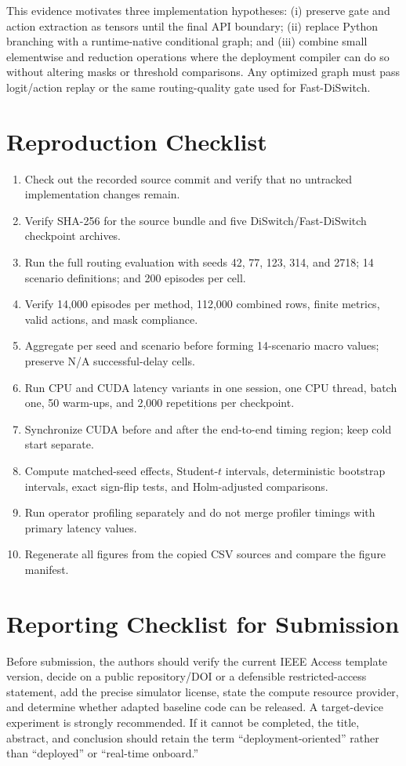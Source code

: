 \documentclass{ieeeaccess}
\begin{document}
This evidence motivates three implementation hypotheses: (i) preserve gate and action extraction as tensors until the final API boundary; (ii) replace Python branching with a runtime-native conditional graph; and (iii) combine small elementwise and reduction operations where the deployment compiler can do so without altering masks or threshold comparisons. Any optimized graph must pass logit/action replay or the same routing-quality gate used for Fast-DiSwitch.

\section{Reproduction Checklist}

\begin{enumerate}
\item Check out the recorded source commit and verify that no untracked implementation changes remain.
\item Verify SHA-256 for the source bundle and five DiSwitch/Fast-DiSwitch checkpoint archives.
\item Run the full routing evaluation with seeds 42, 77, 123, 314, and 2718; 14 scenario definitions; and 200 episodes per cell.
\item Verify 14,000 episodes per method, 112,000 combined rows, finite metrics, valid actions, and mask compliance.
\item Aggregate per seed and scenario before forming 14-scenario macro values; preserve N/A successful-delay cells.
\item Run CPU and CUDA latency variants in one session, one CPU thread, batch one, 50 warm-ups, and 2,000 repetitions per checkpoint.
\item Synchronize CUDA before and after the end-to-end timing region; keep cold start separate.
\item Compute matched-seed effects, Student-$t$ intervals, deterministic bootstrap intervals, exact sign-flip tests, and Holm-adjusted comparisons.
\item Run operator profiling separately and do not merge profiler timings with primary latency values.
\item Regenerate all figures from the copied CSV sources and compare the figure manifest.
\end{enumerate}

\section{Reporting Checklist for Submission}

Before submission, the authors should verify the current IEEE Access template version, decide on a public repository/DOI or a defensible restricted-access statement, add the precise simulator license, state the compute resource provider, and determine whether adapted baseline code can be released. A target-device experiment is strongly recommended. If it cannot be completed, the title, abstract, and conclusion should retain the term ``deployment-oriented'' rather than ``deployed'' or ``real-time onboard.''

\EOD
\end{document}
